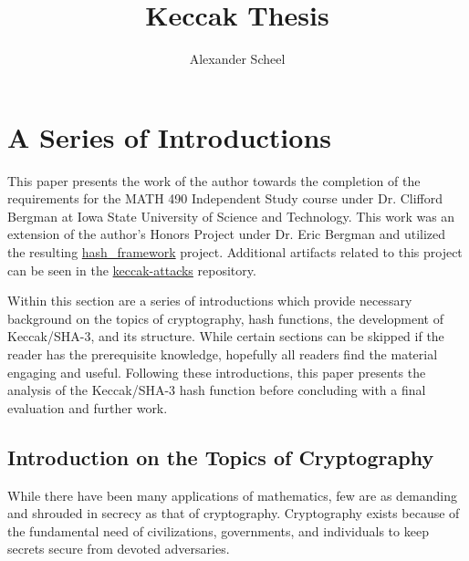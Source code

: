 \documentclass[10pt,twocolumn,twoside]{pnas-new}
\title{Keccak Thesis}
\author{Alexander Scheel}
\affil{Iowa State University}
\begin{document}
\verticaladjustment{-2pt}

\maketitle

% 

\section{A Series of Introductions} \label{sec:intro}
    This paper presents the work of the author towards the completion of the
requirements for the MATH 490 Independent Study course under Dr. Clifford
Bergman at Iowa State University of Science and Technology. This work was an
extension of the author's Honors Project under Dr. Eric Bergman and utilized
the resulting
\href{https://github.com/cipherboy/hash_framework}{hash\_framework} project.
Additional artifacts related to this project can be seen in the
\href{https://github.com/cipherboy/keccak-attacks}{keccak-attacks} repository.

    Within this section are a series of introductions which provide necessary
background on the topics of cryptography, hash functions, the development of
Keccak/SHA-3, and its structure. While certain sections can be skipped if the
reader has the prerequisite knowledge, hopefully all readers find the material
engaging and useful. Following these introductions, this paper presents the
analysis of the Keccak/SHA-3 hash function before concluding with a final
evaluation and further work.


\subsection{Introduction on the Topics of Cryptography} \label{sec:i:crypto}

    While there have been many applications of mathematics, few are as
demanding and shrouded in secrecy as that of cryptography. Cryptography exists
because of the fundamental need of civilizations, governments, and individuals
to keep secrets secure from devoted adversaries.
\end{document}
